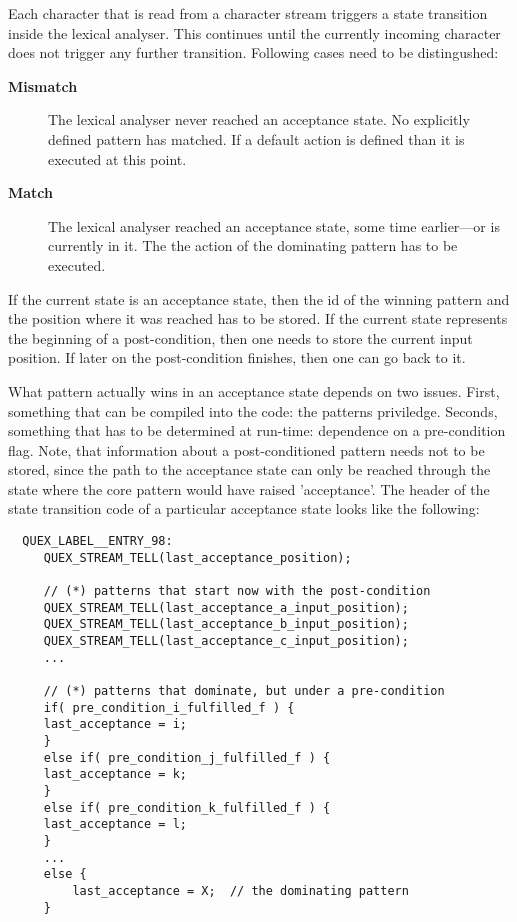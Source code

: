 Each character that is read from a character stream
triggers a state transition inside the lexical analyser. This
continues until the currently incoming character does not
trigger any further transition. Following cases need to be
distingushed:

\begin{description}
\item[\bf Mismatch] The lexical analyser never reached an acceptance state.
                    No explicitly defined pattern has matched. If a default
		    action is defined than it is executed at this point.

\item[\bf Match] The lexical analyser reached an acceptance state, some time
		 earlier---or is currently in it. The the action of the
		 dominating pattern has to be executed.
\end{description}

If the current state is an acceptance state, then the id of the
winning pattern and the position where it was reached has to be stored. If the
current state represents the beginning of a post-condition, then one needs to
store the current input position. If later on the post-condition finishes,
then one can go back to it.

What pattern actually wins in an acceptance state depends on two 
issues. First, something that can be compiled into the code: the
patterns priviledge. Seconds, something that has to be determined
at run-time: dependence on a pre-condition flag. Note, that information
about a post-conditioned pattern needs not to be stored, since
the path to the acceptance state can only be reached through the
state where the core pattern would have raised 'acceptance'.
The header of the state transition code of a particular acceptance 
state looks like the following: 

\begin{lstlisting}
  QUEX_LABEL__ENTRY_98:
     QUEX_STREAM_TELL(last_acceptance_position); 

     // (*) patterns that start now with the post-condition
     QUEX_STREAM_TELL(last_acceptance_a_input_position);
     QUEX_STREAM_TELL(last_acceptance_b_input_position);
     QUEX_STREAM_TELL(last_acceptance_c_input_position);
     ...

     // (*) patterns that dominate, but under a pre-condition
     if( pre_condition_i_fulfilled_f ) {
	 last_acceptance = i;
     } 
     else if( pre_condition_j_fulfilled_f ) {
	 last_acceptance = k;
     }	 
     else if( pre_condition_k_fulfilled_f ) {
	 last_acceptance = l;
     }	 
     ...
     else { 
         last_acceptance = X;  // the dominating pattern
     } 

\end{lstlisting}


